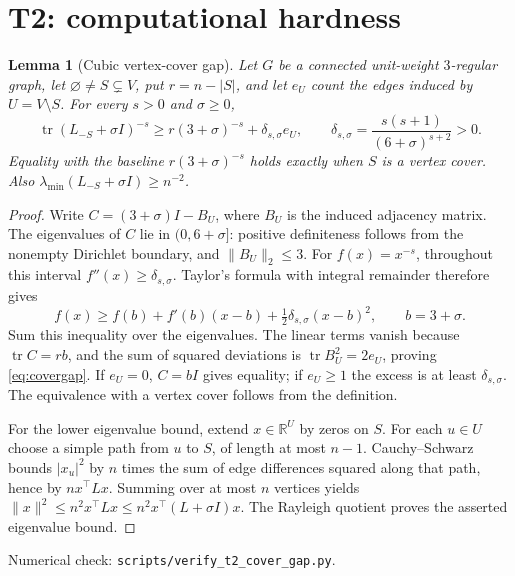 \documentclass[11pt]{article}
\newtheorem{lemma}[theorem]{Lemma}
\DeclareMathOperator{\tr}{tr}
\newcommand{\R}{\mathbb R}
\begin{document}
\section{T2: computational hardness}
\begin{lemma}[Cubic vertex-cover gap]\label{lem:cover}
Let $G$ be a connected unit-weight $3$-regular graph, let
$\varnothing\ne S\subsetneq V$, put $r=n-|S|$, and let $e_U$ count the
edges induced by $U=V\setminus S$. For every $s>0$ and $\sigma\geq0$,
\begin{equation}\label{eq:covergap}
 \tr (L_{-S}+\sigma I)^{-s}
 \geq r(3+\sigma)^{-s}+\delta_{s,\sigma}e_U,
 \qquad \delta_{s,\sigma}=\frac{s(s+1)}{(6+\sigma)^{s+2}}>0.
\end{equation}
Equality with the baseline $r(3+\sigma)^{-s}$ holds exactly when
$S$ is a vertex cover. Also $\lambda_{\min}(L_{-S}+\sigma I)\geq n^{-2}$.
\end{lemma}
\begin{proof}
Write $C=(3+\sigma)I-B_U$, where $B_U$ is the induced adjacency
matrix. The eigenvalues of $C$ lie in $(0,6+\sigma]$: positive
definiteness follows from the nonempty Dirichlet boundary, and
$\|B_U\|_2\leq3$. For $f(x)=x^{-s}$, throughout this interval
$f''(x)\geq\delta_{s,\sigma}$. Taylor's formula with integral remainder
therefore gives
\[
 f(x)\geq f(b)+f'(b)(x-b)+\tfrac12\delta_{s,\sigma}(x-b)^2,
 \qquad b=3+\sigma.
\]
Sum this inequality over the eigenvalues. The linear terms vanish
because $\tr C=rb$, and the sum of squared deviations is
$\tr B_U^2=2e_U$, proving \eqref{eq:covergap}. If $e_U=0$, $C=bI$
gives equality; if $e_U\geq1$ the excess is at least
$\delta_{s,\sigma}$. The equivalence with a vertex cover follows from
the definition.

For the lower eigenvalue bound, extend $x\in\R^U$ by zeros on $S$.
For each $u\in U$ choose a simple path from $u$ to $S$, of length at
most $n-1$. Cauchy--Schwarz bounds $|x_u|^2$ by $n$ times the sum of
edge differences squared along that path, hence by $n x^\top Lx$.
Summing over at most $n$ vertices yields
$\|x\|^2\leq n^2x^\top Lx\leq n^2x^\top(L+\sigma I)x$.
The Rayleigh quotient proves the asserted eigenvalue bound.
\end{proof}
\noindent Numerical check: \texttt{scripts/verify\_t2\_cover\_gap.py}.
\end{document}
